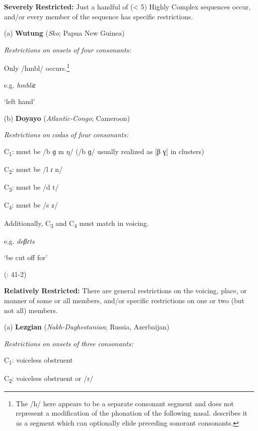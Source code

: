 \ea\label{ex:(3.27)}
  \textbf{Severely} \textbf{Restricted:} Just a handful of (< 5) Highly Complex sequences occur, and/or every member of the sequence has specific restrictions.

(a)   \textbf{Wutung} (\textit{Sko}; Papua New Guinea)

\textit{Restrictions} \textit{on} \textit{onsets} \textit{of} \textit{four} \textit{consonants:}

Only /hmbl/ occurs.\footnote{ \textrm{The /h/ here appears to be a separate consonant segment and does not represent a modification of the phonation of the following nasal. \citet[54]{Marmion2010} describes it as a segment which can optionally elide preceding sonorant consonants.}}

e.g.  \textit{hmbliɛ}

    ‘left hand’

\citep[69]{Marmion2010}

(b)   \textbf{Doyayo} (\textit{Atlantic-Congo}; Cameroon)

\textit{Restrictions} \textit{on} \textit{codas} \textit{of} \textit{four} \textit{consonants:}

C\textsubscript{1}: must be /b ɡ m ŋ/ (/b ɡ/ usually realized as [β ɣ] in clusters)

C\textsubscript{2}: must be /l ɾ n/

C\textsubscript{3}: must be /d t/

C\textsubscript{4}: must be /s z/

\z

Additionally, C\textsubscript{3} and C\textsubscript{4} must match in voicing.

e.g.   \textit{deβɾts}

    ‘be cut off for’

(\citealt{WieringWiering1995}: 41-2)

\ea\label{ex:(3.28)}
  \textbf{Relatively} \textbf{Restricted:} There are general restrictions on the voicing, place, or manner of some or all members, and/or specific restrictions on one or two (but not all) members.

(a)   \textbf{Lezgian} (\textit{Nakh-Daghestanian}; Russia, Azerbaijan)

\textit{Restrictions} \textit{on} \textit{onsets} \textit{of} \textit{three} \textit{consonants:}

C\textsubscript{1}: voiceless obstruent

C\textsubscript{2}: voiceless obstruent or /r/

